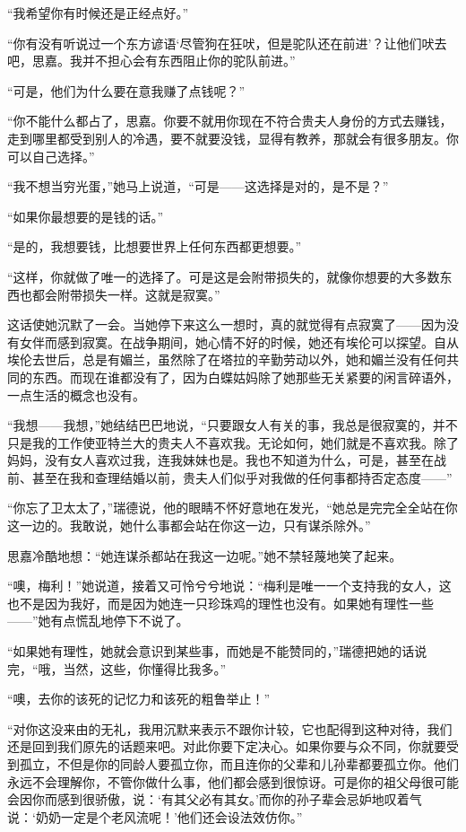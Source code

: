 \par “我希望你有时候还是正经点好。”
\par “你有没有听说过一个东方谚语‘尽管狗在狂吠，但是驼队还在前进’？让他们吠去吧，思嘉。我并不担心会有东西阻止你的驼队前进。”
\par “可是，他们为什么要在意我赚了点钱呢？”
\par “你不能什么都占了，思嘉。你要不就用你现在不符合贵夫人身份的方式去赚钱，走到哪里都受到别人的冷遇，要不就要没钱，显得有教养，那就会有很多朋友。你可以自己选择。”
\par “我不想当穷光蛋，”她马上说道，“可是——这选择是对的，是不是？”
\par “如果你最想要的是钱的话。”
\par “是的，我想要钱，比想要世界上任何东西都更想要。”
\par “这样，你就做了唯一的选择了。可是这是会附带损失的，就像你想要的大多数东西也都会附带损失一样。这就是寂寞。”
\par 这话使她沉默了一会。当她停下来这么一想时，真的就觉得有点寂寞了——因为没有女伴而感到寂寞。在战争期间，她心情不好的时候，她还有埃伦可以探望。自从埃伦去世后，总是有媚兰，虽然除了在塔拉的辛勤劳动以外，她和媚兰没有任何共同的东西。而现在谁都没有了，因为白蝶姑妈除了她那些无关紧要的闲言碎语外，一点生活的概念也没有。
\par “我想——我想，”她结结巴巴地说，“只要跟女人有关的事，我总是很寂寞的，并不只是我的工作使亚特兰大的贵夫人不喜欢我。无论如何，她们就是不喜欢我。除了妈妈，没有女人喜欢过我，连我妹妹也是。我也不知道为什么，可是，甚至在战前、甚至在我和查理结婚以前，贵夫人们似乎对我做的任何事都持否定态度——”
\par “你忘了卫太太了，”瑞德说，他的眼睛不怀好意地在发光，“她总是完完全全站在你这一边的。我敢说，她什么事都会站在你这一边，只有谋杀除外。”
\par 思嘉冷酷地想：“她连谋杀都站在我这一边呢。”她不禁轻蔑地笑了起来。
\par “噢，梅利！”她说道，接着又可怜兮兮地说：“梅利是唯一一个支持我的女人，这也不是因为我好，而是因为她连一只珍珠鸡的理性也没有。如果她有理性一些——”她有点慌乱地停下不说了。
\par “如果她有理性，她就会意识到某些事，而她是不能赞同的，”瑞德把她的话说完，“哦，当然，这些，你懂得比我多。”
\par “噢，去你的该死的记忆力和该死的粗鲁举止！”
\par “对你这没来由的无礼，我用沉默来表示不跟你计较，它也配得到这种对待，我们还是回到我们原先的话题来吧。对此你要下定决心。如果你要与众不同，你就要受到孤立，不但是你的同龄人要孤立你，而且连你的父辈和儿孙辈都要孤立你。他们永远不会理解你，不管你做什么事，他们都会感到很惊讶。可是你的祖父母很可能会因你而感到很骄傲，说：‘有其父必有其女。’而你的孙子辈会忌妒地叹着气说：‘奶奶一定是个老风流呢！’他们还会设法效仿你。”
